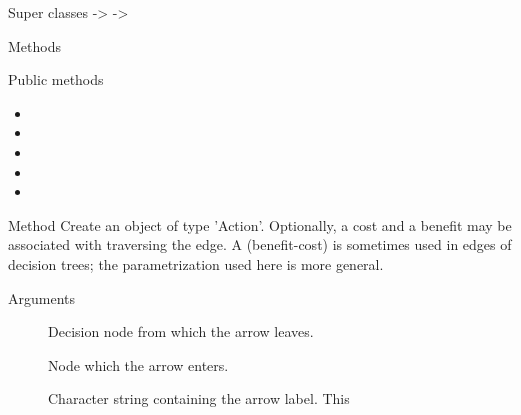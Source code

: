 \documentclass[a4paper]{book}
\begin{document}
%
\begin{Section}{Super classes}
 ->  -> 
\end{Section}
%
\begin{Section}{Methods}
%
\begin{SubSection}{Public methods}
\begin{itemize}

\item{} 
\item{} 
\item{} 
\item{} 
\item{} 

\end{itemize}

\end{SubSection}




\hypertarget{method-new}{}
%
\begin{SubSection}{Method }
Create an object of type 'Action'. Optionally, a cost and a benefit may 
be associated with traversing the edge. A  (benefit-cost) 
is sometimes used in edges of decision trees; the parametrization used 
here is more general.
%


%
\begin{SubSubSection}{Arguments}

\begin{description}

\item[] Decision node from which the arrow leaves.

\item[] Node which the arrow enters.

\item[] Character string containing the arrow label. This


\end{description}
\end{SubSubSection}
\end{SubSection}
\end{Section}
\end{document}

